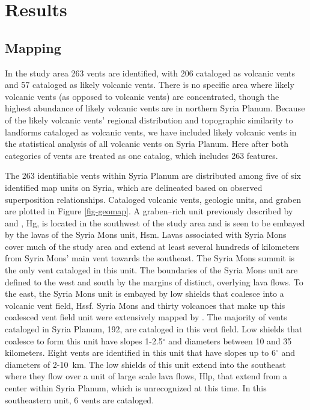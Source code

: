 \section{Results}

\subsection{Mapping}

In the study area 263 vents are identified, with 206 cataloged as volcanic vents and 57 cataloged as likely volcanic vents. There is no specific area where likely volcanic vents (as opposed to volcanic vents) are concentrated, though the highest abundance of likely volcanic vents are in northern Syria Planum. Because of the likely volcanic vents' regional distribution and topographic similarity to landforms cataloged as volcanic vents, we have included likely volcanic vents in the statistical analysis of all volcanic vents on Syria Planum. Here after both categories of vents are treated as one catalog, which includes 263 features.

The 263 identifiable vents within Syria Planum are distributed among five of six identified map units on Syria, which are delineated based on observed superposition relationships. Cataloged volcanic vents, geologic units, and graben are plotted in Figure \ref{fig-geomap}. A graben--rich unit previously described by \citet{Baptista2008} and \citet{Tanaka1988}, Hg, is located in the southwest of the study area and is seen to be embayed by the lavas of the Syria Mons unit, Hsm. Lavas associated with Syria Mons cover much of the study area and extend at least several hundreds of kilometers from Syria Mons' main vent towards the southeast. The Syria Mons summit is the only vent cataloged in this unit. The boundaries of the Syria Mons unit are defined to the west and south by the margins of distinct, overlying lava flows. To the east, the Syria Mons unit is embayed by low shields that coalesce into a volcanic vent field, Hssf. Syria Mons and thirty volcanoes that make up this coalesced vent field unit were extensively mapped by \citet{Baptista2008}. The majority of vents cataloged in Syria Planum, 192, are cataloged in this vent field. Low shields that coalesce to form this unit have slopes 1-2.5$^{\circ}$ and diameters between 10 and 35 kilometers. Eight vents are identified in this unit that have slopes up to 6$^{\circ}$ and diameters of 2-10~km. The low shields of this unit extend into the southeast where they flow over a unit of large scale lava flows, Hlp, that extend from a center within Syria Planum, which is unrecognized at this time. In this southeastern unit, 6 vents are cataloged.

